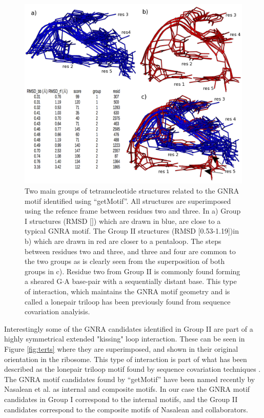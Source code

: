 \begin{figure}
\centering 
\includegraphics[angle=0, scale=2]{Chapter5/groupsB.png}
\caption{Two main groups of  tetranucleotide structures related to the
  GNRA  motif  identified  using  ``getMotif''.   All  structures  are
  superimposed  using  the  refence  frame between  residues  two  and
  three. In a)  Group I structures (RMSD []) which  are drawn in blue,
  are close  to a typical GNRA  motif.  The Group  II structures (RMSD
  [0.53-1.19])in b) which are drawn  in red are closer to a pentaloop.
  The steps  between residues  two and three,  and three and  four are
  common to the  two groups as is clearly  seen from the superposition
  of both groups  in c).  Residue two from Group  II is commonly found
  forming a  sheared G$\cdot$A  base-pair with a  sequentially distant
  base.   This type  of interaction,  which maintains  the  GNRA motif
  geometry and  is called a  lonepair triloop \cite{lee2003}  has been
  previously found from sequence covariation analyisis.}
\label{fig:groupsB}
\end{figure}

Interestingly some of  the GNRA candidates identified in  Group II are
part    of   a    highly   symmetrical    extended    "kissing"   loop
interaction. These  can be seen  in Figure \ref{fig:terts}  where they
are  superimposed, and  shown  in their  original  orientation in  the
ribosome. This type of interaction  is part of what has been described
as the lonepair triloop motif found by sequence covariation techniques
\cite{lee2003}.  The GNRA motif  candidates found by ``getMotif'' have
been named recently by Nasalean et al. \cite{nasalean2009} as internal
and composite motifs.  In our  case the GNRA motif candidates in Group
I  correspond to  the internal  motifs,  and the  Group II  candidates
correspond to the composite motifs of Nasalean and collaborators.


